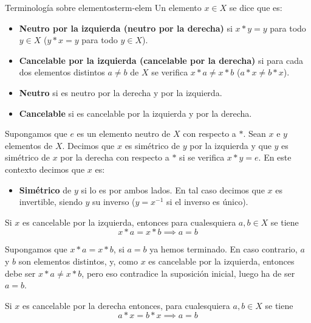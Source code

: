 \begin{definition}{Terminología sobre elementos}{term-elem}
    Un elemento \(x\in X\) se dice que es:
    \begin{itemize}
        \item \textbf{Neutro por la izquierda (neutro por la derecha)} si \(x*y=y\) para todo \(y\in X\) (\(y*x=y\) para todo \(y\in X\)).
        
        \item \textbf{Cancelable por la izquierda (cancelable por la derecha)} si para cada dos elementos distintos \(a \neq b\) de \(X\) se verifica \(x*a\neq x*b\) (\(a*x\neq b*x\)).
        
        \item \textbf{Neutro} si es neutro por la derecha y por la izquierda.

        \item \textbf{Cancelable} si es cancelable por la izquierda y por la derecha.
    \end{itemize}

    Supongamos que \(e\) es un elemento neutro de \(X\) con respecto a \(*\). Sean \(x\) e \(y\) elementos de \(X\). Decimos que \(x\) es simétrico de \(y\) por la izquierda y que \(y\) es simétrico de \(x\) por la derecha con respecto a \(*\) si se verifica \(x*y=e\). En este contexto decimos que $x$ es:
    \begin{itemize}
        \item \textbf{Simétrico} de $y$ si lo es por ambos lados. En tal caso decimos que $x$ es invertible, siendo $y$ su inverso ($y = x^{-1}$ si el inverso es único).
    \end{itemize}
\end{definition}

\begin{example}{}{}
    Si $x$ es cancelable por la izquierda, entonces para cualesquiera $a,b \in X$ se tiene
    \[
    x * a = x * b \implies a = b
    \]
\end{example}

\begin{proofbox}
    Supongamos que $x * a = x * b$, si $a = b$ ya hemos terminado. En caso contrario, $a$ y $b$ son elementos distintos, y, como $x$ es cancelable por la izquierda, entonces debe ser $x * a \neq x * b$, pero eso contradice la suposición inicial, luego ha de ser $a = b$.
\end{proofbox}

\begin{example}{}{}
Si $x$ es cancelable por la derecha entonces, para cualesquiera $a,b \in X$ se tiene
    \[
    a * x = b * x \implies a = b
    \]
\end{example}

